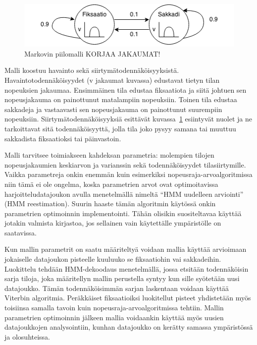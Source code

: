 \begin{figure}[h]
    \includegraphics[width=1.0\textwidth]{HMM.png}
		\caption{Markovin piilomalli KORJAA JAKAUMAT!}
		\label{fig:hmm_sample}
\end{figure}

Malli koostuu havainto sekä siirtymätodennäköisyyksistä. Havaintotodennäköisyydet (v jakaumat kuvassa) edustavat tietyn tilan nopeuksien jakaumaa. Ensimmäinen tila edustaa fiksaatiota ja siitä johtuen sen nopeusjakauma on painottunut matalampiin nopeuksiin. Toinen tila edustaa sakkadeja ja vastaavasti sen nopeusjakauma on painottunut suurempiin nopeuksiin. Siirtymätodennäköisyyksiä esittävät kuvassa~\ref{fig:hmm_sample} esiintyvät nuolet ja ne tarkoittavat sitä todennäköisyyttä, jolla tila joko pysyy samana tai muuttuu sakkadista fiksaatioksi tai päinvastoin.

Malli tarvitsee toimiakseen kahdeksan parametria: molempien tilojen nopeusjakaumien keskiarvon ja varianssin sekä todennäköisyydet tilasiirtymille. Vaikka parametreja onkin enemmän kuin esimerkiksi nopeusraja-arvoalgoritmissa niin tämä ei ole ongelma, koska parametrien arvot ovat optimoitavissa harjoitteludatajoukon avulla menetelmällä nimeltä ``HMM uudelleen arviointi'' (HMM reestimation).\citep[s. 180]{salvucci1999} Suurin haaste tämän algoritmin käytössä onkin parametrien optimoinnin implementointi. Tähän olisikin suositeltavaa käyttää jotakin valmista kirjastoa, jos sellainen vain käytettälle ympäristölle on saatavissa.

Kun mallin parametrit on saatu määriteltyä voidaan mallia käyttää arvioimaan jokaiselle datajoukon pisteelle kuuluuko se fiksaatiohin vai sakkadeihin. Luokittelu tehdään HMM-dekoodaus menetelmällä, jossa etsitään todennäköisin sarja tiloja, joka määritellyn mallin perustella syntyy kun sille syötetään uusi datajoukko. Tämän todennäköisimmän sarjan laskentaan voidaan käyttää Viterbin algoritmia.\citep[s. 178]{salvucci1999}  Peräkkäiset fiksaatioiksi luokitellut pisteet yhdistetään myös toisiinsa samalla tavoin kuin nopeusraja-arvoalgoritmissa tehtiin.\citep[s. 31]{salvucci1999} Mallin parametrien optimoinnin jälkeen mallia voidaankin käyttää myös uusien datajoukkojen analysointiin, kunhan datajoukko on kerätty samassa ympäristössä ja olosuhteissa.

